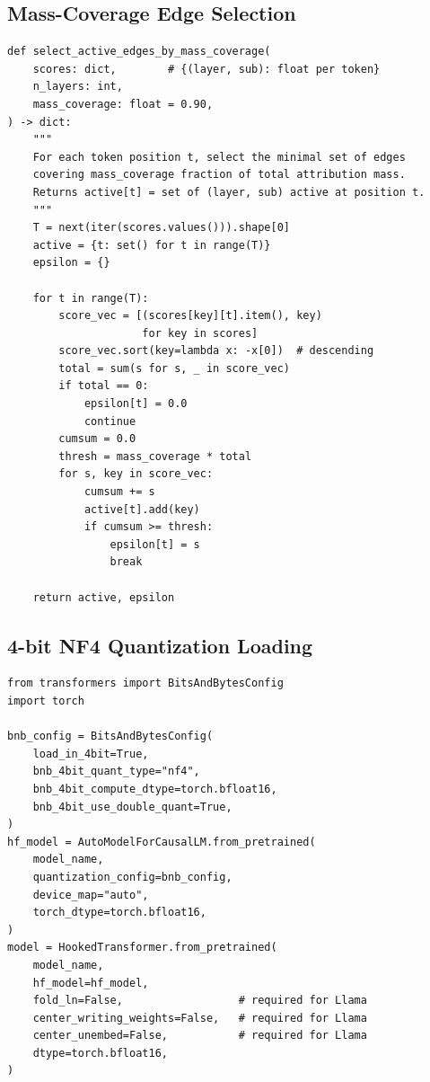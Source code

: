 \documentclass{article}
\begin{document}
\subsection{Mass-Coverage Edge Selection}

\begin{verbatim}
def select_active_edges_by_mass_coverage(
    scores: dict,        # {(layer, sub): float per token}
    n_layers: int,
    mass_coverage: float = 0.90,
) -> dict:
    """
    For each token position t, select the minimal set of edges
    covering mass_coverage fraction of total attribution mass.
    Returns active[t] = set of (layer, sub) active at position t.
    """
    T = next(iter(scores.values())).shape[0]
    active = {t: set() for t in range(T)}
    epsilon = {}

    for t in range(T):
        score_vec = [(scores[key][t].item(), key)
                     for key in scores]
        score_vec.sort(key=lambda x: -x[0])  # descending
        total = sum(s for s, _ in score_vec)
        if total == 0:
            epsilon[t] = 0.0
            continue
        cumsum = 0.0
        thresh = mass_coverage * total
        for s, key in score_vec:
            cumsum += s
            active[t].add(key)
            if cumsum >= thresh:
                epsilon[t] = s
                break

    return active, epsilon
\end{verbatim}

\subsection{4-bit NF4 Quantization Loading}

\begin{verbatim}
from transformers import BitsAndBytesConfig
import torch

bnb_config = BitsAndBytesConfig(
    load_in_4bit=True,
    bnb_4bit_quant_type="nf4",
    bnb_4bit_compute_dtype=torch.bfloat16,
    bnb_4bit_use_double_quant=True,
)
hf_model = AutoModelForCausalLM.from_pretrained(
    model_name,
    quantization_config=bnb_config,
    device_map="auto",
    torch_dtype=torch.bfloat16,
)
model = HookedTransformer.from_pretrained(
    model_name,
    hf_model=hf_model,
    fold_ln=False,                  # required for Llama
    center_writing_weights=False,   # required for Llama
    center_unembed=False,           # required for Llama
    dtype=torch.bfloat16,
)
\end{verbatim}
\end{document}
